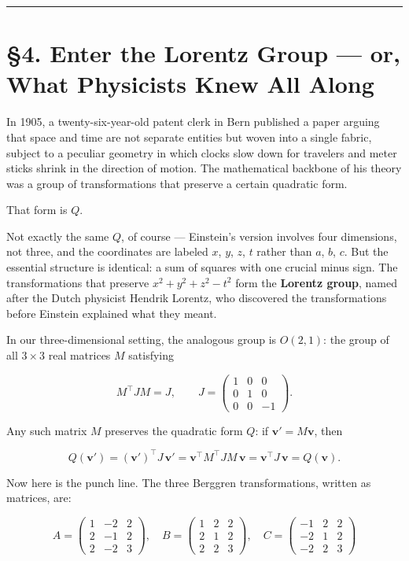 \documentclass[11pt,openany]{book}
\theoremstyle{definition}
\theoremstyle{plain}
\theoremstyle{remark}
\begin{document}
\bigskip\noindent\rule{\textwidth}{0.4pt}\bigskip


\section{§4. Enter the Lorentz Group — or, What Physicists Knew All Along}


In 1905, a twenty-six-year-old patent clerk in Bern published a paper arguing that space and time are not separate entities but woven into a single fabric, subject to a peculiar geometry in which clocks slow down for travelers and meter sticks shrink in the direction of motion. The mathematical backbone of his theory was a group of transformations that preserve a certain quadratic form.

That form is $Q$.

Not exactly the same $Q$, of course — Einstein's version involves four dimensions, not three, and the coordinates are labeled $x$, $y$, $z$, $t$ rather than $a$, $b$, $c$. But the essential structure is identical: a sum of squares with one crucial minus sign. The transformations that preserve $x^2 + y^2 + z^2 - t^2$ form the \textbf{Lorentz group}, named after the Dutch physicist Hendrik Lorentz, who discovered the transformations before Einstein explained what they meant.

In our three-dimensional setting, the analogous group is $O(2,1)$: the group of all $3 \times 3$ real matrices $M$ satisfying

$$M^\top J M = J, \qquad J = \begin{pmatrix} 1 & 0 & 0 \\ 0 & 1 & 0 \\ 0 & 0 & -1 \end{pmatrix}.$$

Any such matrix $M$ preserves the quadratic form $Q$: if $\mathbf{v}' = M\mathbf{v}$, then

$$Q(\mathbf{v}') = (\mathbf{v}')^\top J\, \mathbf{v}' = \mathbf{v}^\top M^\top J M\, \mathbf{v} = \mathbf{v}^\top J\, \mathbf{v} = Q(\mathbf{v}).$$

Now here is the punch line. The three Berggren transformations, written as matrices, are:

$$A = \begin{pmatrix} 1 & -2 & 2 \\ 2 & -1 & 2 \\ 2 & -2 & 3 \end{pmatrix}, \quad B = \begin{pmatrix} 1 & 2 & 2 \\ 2 & 1 & 2 \\ 2 & 2 & 3 \end{pmatrix}, \quad C = \begin{pmatrix} -1 & 2 & 2 \\ -2 & 1 & 2 \\ -2 & 2 & 3 \end{pmatrix}$$
\end{document}
